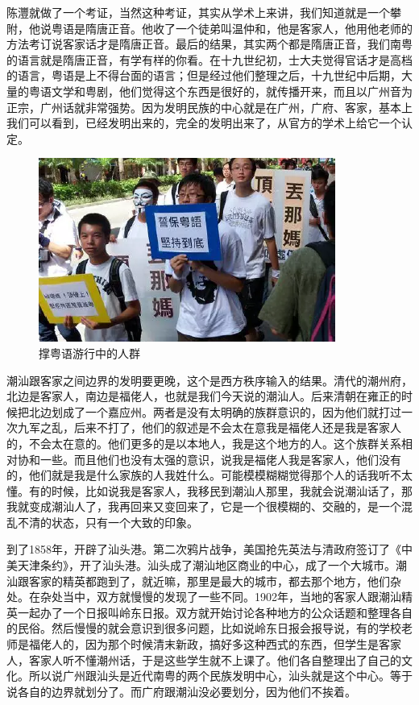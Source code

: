 陈灃就做了一个考证，当然这种考证，其实从学术上来讲，我们知道就是一个攀附，他说粤语是隋唐正音。他收了一个徒弟叫温仲和，他是客家人，他用他老师的方法考订说客家话才是隋唐正音。最后的结果，其实两个都是隋唐正音，我们南粤的语言就是隋唐正音，有学有样的你看。在十九世纪初，士大夫觉得官话才是高档的语言，粤语是上不得台面的语言；但是经过他们整理之后，十九世纪中后期，大量的粤语文学和粤剧，他们觉得这个东西是很好的，就传播开来，而且以广州音为正宗，广州话就非常强势。因为发明民族的中心就是在广州，广府、客家，基本上我们可以看到，已经发明出来的，完全的发明出来了，从官方的学术上给它一个认定。

\begin{figure}
	\centering
	\includegraphics[width=\textwidth]{images/image-74}
	\caption{撑粤语游行中的人群}
\end{figure}

潮汕跟客家之间边界的发明要更晚，这个是西方秩序输入的结果。清代的潮州府，北边是客家人，南边是福佬人，也就是我们今天说的潮汕人。后来清朝在雍正的时候把北边划成了一个嘉应州。两者是没有太明确的族群意识的，因为他们就打过一次九军之乱，后来不打了，他们的叙述是不会太在意我是福佬人还是我是客家人的，不会太在意的。他们更多的是以本地人，我是这个地方的人。这个族群关系相对协和一些。而且他们也没有太强的意识，说我是福佬人我是客家人，他们没有的，他们就是我是什么家族的人我姓什么。可能模模糊糊觉得那个人的话我听不太懂。有的时候，比如说我是客家人，我移民到潮汕人那里，我就会说潮汕话了，那我就变成潮汕人了，我再回来又变回来了，它是一个很模糊的、交融的，是一个混乱不清的状态，只有一个大致的印象。

到了1858年，开辟了汕头港。第二次鸦片战争，美国抢先英法与清政府签订了《中美天津条约》，开了汕头港。汕头成了潮汕地区商业的中心，成了一个大城市。潮汕跟客家的精英都跑到了，就近嘛，那里是最大的城市，都去那个地方，他们杂处。在杂处当中，双方就慢慢的发现了一些不同。1902年，当地的客家人跟潮汕精英一起办了一个日报叫岭东日报。双方就开始讨论各种地方的公众话题和整理各自的民俗。然后慢慢的就会意识到很多问题，比如说岭东日报会报导说，有的学校老师是福佬人的，因为那个时候清末新政，搞好多这种西式的东西，但学生是客家人，客家人听不懂潮州话，于是这些学生就不上课了。他们各自整理出了自己的文化。所以说广州跟汕头是近代南粤的两个民族发明中心，汕头就是这个中心。等于说各自的边界就划分了。而广府跟潮汕没必要划分，因为他们不挨着。

